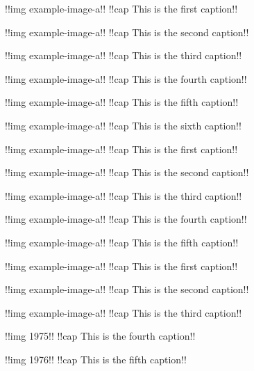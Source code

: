 \documentclass{article}
\begin{document}
\begin{multiimages}[env=figure,pos=ht]
  !!img example-image-a!! 
  !!cap This is the first caption!!

  !!img example-image-a!!
  !!cap This is the second caption!!

  !!img example-image-a!!
  !!cap This is the third caption!!

  !!img example-image-a!!
  !!cap This is the fourth caption!!

  !!img example-image-a!!
  !!cap This is the fifth caption!!

  !!img example-image-a!!
  !!cap This is the sixth caption!!
\end{multiimages}

\begin{multiimages}[last=center]
  !!img example-image-a!! 
  !!cap This is the first caption!!

  !!img example-image-a!!
  !!cap This is the second caption!!

  !!img example-image-a!!
  !!cap This is the third caption!!

  !!img example-image-a!!
  !!cap This is the fourth caption!!

  !!img example-image-a!!
  !!cap This is the fifth caption!!

\end{multiimages}

\begin{multiimages}[last=center,env=figure,pos=p,inner=3cm,skip=10ex]
  !!img example-image-a!! 
  !!cap This is the first caption!!

  !!img example-image-a!!
  !!cap This is the second caption!!

  !!img example-image-a!!
  !!cap This is the third caption!!

  !!img 1975!!
  !!cap This is the fourth caption!!

  !!img 1976!!
  !!cap This is the fifth caption!!

\end{multiimages}
\end{document}
